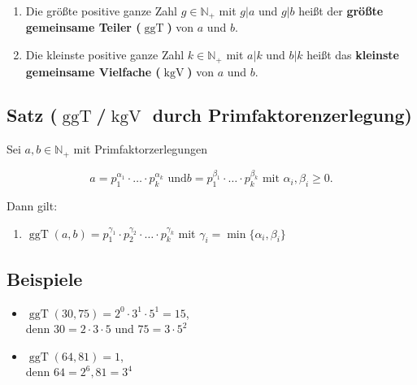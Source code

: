 	\begin{enumerate}
	
		\item Die größte positive ganze Zahl $g\in\mathbb{N_+}$ mit $g|a$ und $g|b$
		heißt der \textbf{größte gemeinsame Teiler ($\operatorname{ggT}$)} von $a$ und $b$.
		
		\item Die kleinste positive ganze Zahl $k\in\mathbb{N_+}$ mit $a|k$ und $b|k$
		heißt das \textbf{kleinste gemeinsame Vielfache ($\operatorname{kgV}$)}
		von $a$ und $b$.
		
	\end{enumerate}


\subsection[$\operatorname{ggT}$/$\operatorname{kgV}$ durch Primfaktorenzerlegung]{Satz ($\operatorname{ggT}$/$\operatorname{kgV}$ durch Primfaktorenzerlegung)}

	Sei $a,b\in\mathbb{N_+}$ mit Primfaktorzerlegungen 

	\[
		a=p_1^{\alpha_1}\cdot\ldots\cdot p_k^{\alpha_k}\text{ und}
		b=p_1^{\beta_1}\cdot\ldots\cdot p_k^{\beta_k}\text{ mit }\alpha_i,\beta_i\geq 0.
	\]
	
	Dann gilt:
	
	\begin{enumerate}
		
		\item $\operatorname{ggT}(a,b)=p_1^{\gamma_1}\cdot p_2^{\gamma_2}
		\cdot\ldots\cdot p_k^{\gamma_k}$ mit $\gamma_i=\operatorname{min}
		\{\alpha_i,\beta_i\}$
		
		
	\end{enumerate}
	
		
\subsection{Beispiele}

	\begin{itemize}
			
	\item $\operatorname{ggT}(30,75)=2^0\cdot 3^1\cdot 5^1 = 15$,\\ 
	denn $30=2\cdot 3\cdot 5$ und $75=3\cdot 5^2$
	
	\item $\operatorname{ggT}(64,81)=1$,\\ denn $64=2^6,81=3^4$

	\end{itemize}	

